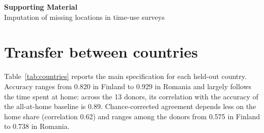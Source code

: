 \documentclass[a4paper]{article}
\begin{document}
\clearpage
\newpage

\printbibliography

\clearpage
\setcounter{section}{0}
\renewcommand{\thesection}{S\arabic{section}}
\renewcommand{\theHsection}{S\arabic{section}}
\setcounter{table}{0}
\renewcommand{\thetable}{S\arabic{table}}
\renewcommand{\theHtable}{S\arabic{table}}
\setcounter{figure}{0}
\renewcommand{\thefigure}{S\arabic{figure}}
\renewcommand{\theHfigure}{S\arabic{figure}}

\begin{center}
{\Large\bfseries Supporting Material}\\[4pt]
Imputation of missing locations in time-use surveys
\end{center}

\section{Transfer between countries}
\label{sec:res_countries}

Table~\ref{tab:countries} reports the main specification for each held-out country. Accuracy ranges from 0.820 in Finland to 0.929 in Romania and largely follows the time spent at home: across the 13 donors, its correlation with the accuracy of the all-at-home baseline is 0.89. Chance-corrected agreement depends less on the home share (correlation 0.62) and ranges among the donors from 0.575 in Finland to 0.738 in Romania.
\end{document}
